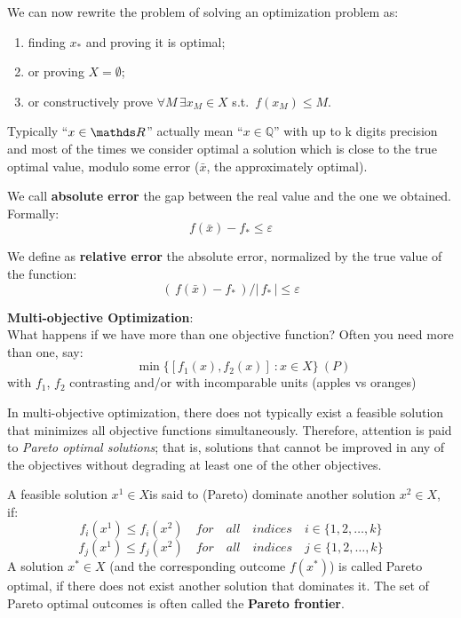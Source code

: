 \documentclass[ComputationalMathematics.tex]{subfiles}
\begin{document}
\noindent We can now rewrite the problem of solving an optimization problem as:
\begin{enumerate}
  \item finding $x_*$ and proving it is optimal;
  \item or proving $X = \emptyset$;
  \item or constructively prove $\forall M \, \exists x_M \in X$ s.t.~$f(x_M) \leq M$.
\end{enumerate}

Typically “$x \in \R$” actually mean “$x \in \mathbb{Q}$” with up to k digits precision and most of the times we consider optimal a solution which is close to the true optimal value, modulo some error ($\bar{x}$, the approximately optimal).

\begin{definition}
  We call \textbf{absolute error} the gap between the real value and the one we obtained. Formally:
\[
  f(\bar{x}) - f_* \leq \varepsilon
\]
\end{definition}

\begin{definition}
  We define as \textbf{relative error} the absolute error, normalized by the true value of the function:
\[
  ( \, f(\bar{x}) - f_* \, ) / | \, f_* \, | \leq \varepsilon
\]
\end{definition}

\noindent \textbf{Multi-objective Optimization}:\\
What happens if we have more than one objective function?\newline
Often you need more than one, say:
\[
  \qquad \min \{[f_1(x),f_2(x)]~:x \in X\}~(P)
\]
with $f_1$, $f_2$ contrasting and/or with incomparable units (apples vs oranges)

In multi-objective optimization, there does not typically exist a feasible solution that minimizes all objective functions simultaneously. Therefore, attention is paid to \emph{Pareto optimal solutions}; that is, solutions that cannot be improved in any of the objectives without degrading at least one of the other objectives.
\begin{definition}
   A feasible solution $x^{1} \in X$is said to (Pareto) dominate another solution $x^{2} \in X$, if:
  \[
  f_{i}(x^{1})\leq f_{i}(x^{2})\quad for\quad all\quad indices\quad i \in \{ 1,2,\dots ,k\}
\]
\[
  f_{j}(x^{1})\leq f_{j}(x^{2})\quad for\quad all\quad indices\quad j \in \{ 1,2,\dots ,k\}
\]
A solution $x^{*}\in X$ (and the corresponding outcome $f(x^{*})$) is called Pareto optimal, if there does not exist another solution that dominates it. The set of Pareto optimal outcomes is often called the \textbf{Pareto frontier}.
\end{definition}
\end{document}
